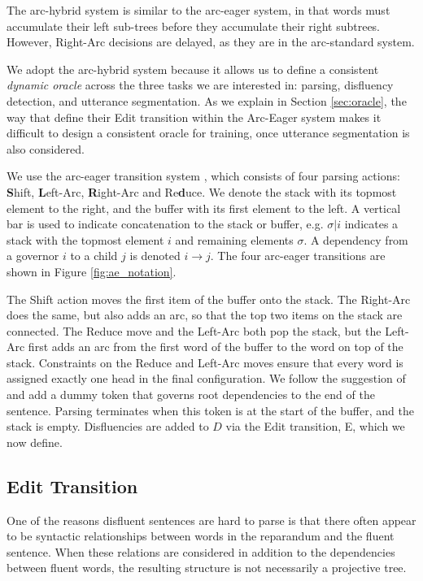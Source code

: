 \documentclass[11pt,letterpaper]{article}
\begin{document}
The arc-hybrid system is similar to the arc-eager system, in that words must
accumulate their left sub-trees before they accumulate their right subtrees.
However, Right-Arc decisions are delayed, as they are in the arc-standard system.

We adopt the arc-hybrid system because it allows us to define a consistent
\emph{dynamic oracle} across the three tasks we are interested in: parsing,
disfluency detection,
and utterance segmentation.  As we explain in Section \ref{sec:oracle}, the way
that \citet{honnibal:14} define their Edit transition within the Arc-Eager system
makes it difficult to design a consistent oracle for training, once utterance
segmentation is also considered.

We use the arc-eager transition system \citep{nivre:03,nivre:cl}, which consists
of four parsing actions:  \textbf{S}hift, \textbf{L}eft-Arc,
\textbf{R}ight-Arc and Re\textbf{d}uce.
We denote the stack with its topmost element
to the right, and the buffer with its first element to the left. A vertical bar
is used to indicate concatenation to the stack or buffer, e.g. $\sigma | i$ indicates
a stack with the topmost element $i$ and remaining elements $\sigma$.  
A dependency from a governor $i$ to a child $j$ is denoted $i \rightarrow j$.
The four arc-eager transitions are shown in Figure \ref{fig:ae_notation}.

The Shift action moves the first item of the buffer onto the stack.
The Right-Arc does the same, but also adds an arc, so that the top two items
on the stack are connected. The Reduce move and the Left-Arc both pop the stack,
but the Left-Arc first adds an arc from the first word of the buffer to the word
on top of the stack. Constraints on the Reduce and Left-Arc
moves ensure that every word is assigned exactly one head in the final configuration.
We follow the suggestion of \citet{nivre:squib} and
add a dummy token that governs root dependencies to the end of the sentence.
Parsing terminates when this token is at the start of the buffer, and the stack is empty.
Disfluencies are added to $D$ via the Edit transition, E, which we now define.

\subsection{Edit Transition}
\label{sec:edittrans}

One of the reasons disfluent sentences are hard to parse is that there often appear
to be syntactic relationships between words in the reparandum and the fluent sentence.
When these relations are considered in addition to the dependencies between fluent words,
the resulting structure is not necessarily a projective tree.
\end{document}
